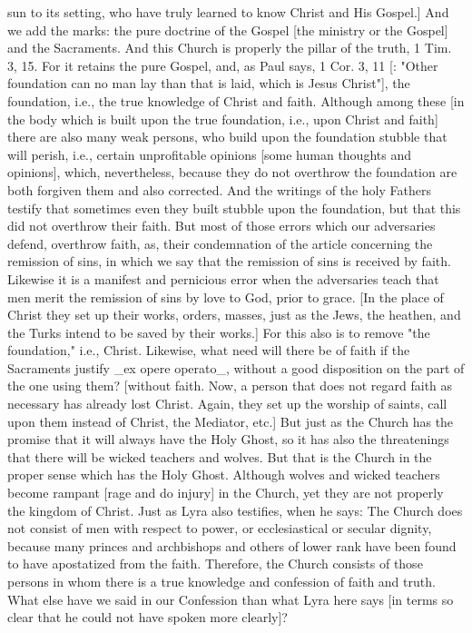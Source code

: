 sun to its setting, who have truly learned to know Christ and His
Gospel.] And we add the marks: the pure doctrine of the Gospel [the
ministry or the Gospel] and the Sacraments.  And this Church is
properly the pillar of the truth, 1 Tim. 3, 15. For it retains the
pure Gospel, and, as Paul says, 1 Cor. 3, 11 [: "Other foundation can
no man lay than that is laid, which is Jesus Christ"], the foundation,
i.e., the true knowledge of Christ and faith.  Although among these
[in the body which is built upon the true foundation, i.e., upon
Christ and faith] there are also many weak persons, who build upon
the foundation stubble that will perish, i.e., certain unprofitable
opinions [some human thoughts and opinions], which, nevertheless,
because they do not overthrow the foundation are both forgiven them
and also corrected.  And the writings of the holy Fathers testify
that sometimes even they built stubble upon the foundation, but that
this did not overthrow their faith.  But most of those errors which
our adversaries defend, overthrow faith, as, their condemnation of
the article concerning the remission of sins, in which we say that
the remission of sins is received by faith.  Likewise it is a
manifest and pernicious error when the adversaries teach that men
merit the remission of sins by love to God, prior to grace.  [In the
place of Christ they set up their works, orders, masses, just as the
Jews, the heathen, and the Turks intend to be saved by their works.]
For this also is to remove "the foundation," i.e., Christ.  Likewise,
what need will there be of faith if the Sacraments justify _ex opere
operato_, without a good disposition on the part of the one using
them? [without faith.  Now, a person that does not regard faith as
necessary has already lost Christ.  Again, they set up the worship of
saints, call upon them instead of Christ, the Mediator, etc.] But
just as the Church has the promise that it will always have the Holy
Ghost, so it has also the threatenings that there will be wicked
teachers and wolves.  But that is the Church in the proper sense
which has the Holy Ghost.  Although wolves and wicked teachers become
rampant [rage and do injury] in the Church, yet they are not properly
the kingdom of Christ.  Just as Lyra also testifies, when he says:
The Church does not consist of men with respect to power, or
ecclesiastical or secular dignity, because many princes and
archbishops and others of lower rank have been found to have
apostatized from the faith.  Therefore, the Church consists of those
persons in whom there is a true knowledge and confession of faith and
truth.  What else have we said in our Confession than what Lyra here
says [in terms so clear that he could not have spoken more clearly]?

